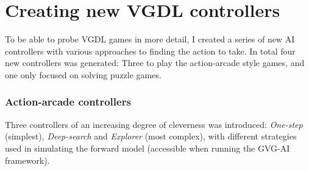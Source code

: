 \documentclass[a4paper,titlepage,final]{report}
\begin{document}

\section{Creating new VGDL controllers}
\label{sec_creatingnewcontrollers}
To be able to probe VGDL games in more detail, I created a series of new AI controllers with various approaches to finding the action to take.
In total four new controllers was generated: Three to play the action-arcade style games, and one only focused on solving puzzle games.

\subsubsection*{Action-arcade controllers}
Three controllers of an increasing degree of cleverness was introduced: \textit{One-step} (simplest), \textit{Deep-search} and \textit{Explorer} (most complex), with different strategies used in simulating the forward model (accessible when running the GVG-AI framework).
\end{document}
